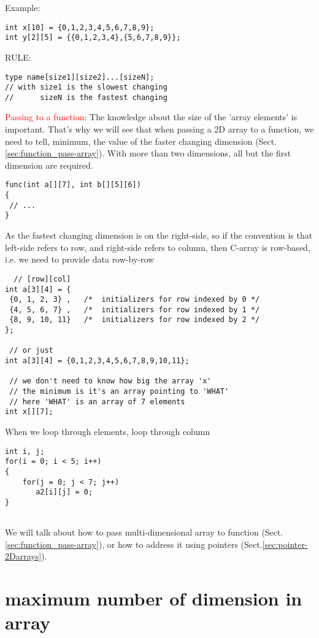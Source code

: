 Example:
\begin{verbatim}
int x[10] = {0,1,2,3,4,5,6,7,8,9};
int y[2][5] = {{0,1,2,3,4},{5,6,7,8,9}};
\end{verbatim}


RULE:
\begin{verbatim}
type name[size1][size2]...[sizeN];
// with size1 is the slowest changing
//      sizeN is the fastest changing
\end{verbatim}


\textcolor{red}{Passing to a function}: The knowledge about the size of the
'array elements' is important. That's why we will see that when passing a 2D
array to a function, we need to tell, minimum, the value of the faster changing
dimension (Sect.\ref{sec:function_pass-array}). With more than two dimensions, all but the
first dimension are required.
\begin{verbatim}
func(int a[][7], int b[][5][6])
{
 //	...
}
\end{verbatim}

As the fastest changing dimension is on the right-side, so if the convention is
that left-side refers to row, and right-side refers to column, then C-array is
row-based, i.e. we need to provide data row-by-row
\begin{verbatim}
  // [row][col]
int a[3][4] = {  
 {0, 1, 2, 3} ,   /*  initializers for row indexed by 0 */
 {4, 5, 6, 7} ,   /*  initializers for row indexed by 1 */
 {8, 9, 10, 11}   /*  initializers for row indexed by 2 */
};

 // or just
int a[3][4] = {0,1,2,3,4,5,6,7,8,9,10,11};

 // we don't need to know how big the array 'x'
 // the minimum is it's an array pointing to 'WHAT'
 // here 'WHAT' is an array of 7 elements
int x[][7];

\end{verbatim}

When we loop through elements, loop through column 
\begin{verbatim}
int i, j;
for(i = 0; i < 5; i++)
{
    for(j = 0; j < 7; j++)
       a2[i][j] = 0;
}
    
\end{verbatim}

We will talk about how to pass multi-dimensional array to function
(Sect.\ref{sec:function_pass-array}), or how to address it using pointers
(Sect.\ref{sec:pointer-2Darrays}).


\section{maximum number of dimension in array}

